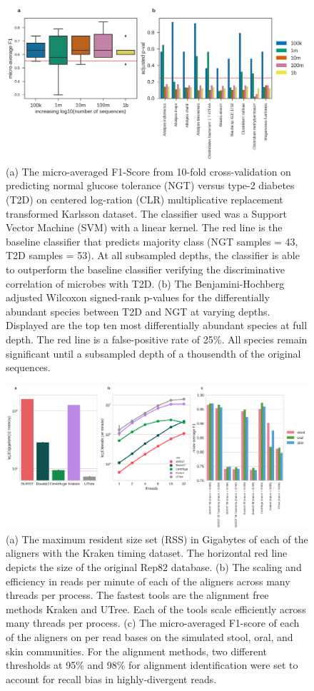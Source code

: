 \begin{figure}[hbt]
    \centering
    \includegraphics[width=0.8\linewidth]{fig/karlsson2013_f1_combined.png}
    \caption{
        (a) The micro-averaged F1-Score from 10-fold cross-validation on predicting normal glucose tolerance (NGT) versus type-2 diabetes (T2D) on centered log-ration (CLR) multiplicative replacement transformed Karlsson dataset. The classifier used was a Support Vector Machine (SVM) with a linear kernel. The red line is the baseline classifier that predicts majority class (NGT samples = 43, T2D samples = 53). At all subsampled depths, the classifier is able to outperform the baseline classifier verifying the discriminative correlation of microbes with T2D. (b) The Benjamini-Hochberg adjusted Wilcoxon signed-rank p-values for the differentially abundant species between T2D and NGT at varying depths. Displayed are the top ten most differentially abundant species at full depth. The red line is a false-positive rate of 25\%. All species remain significant until a subsampled depth of a thousendth of the original sequences.
    }
    \label{fig:karlsson2013_f1_combined}
\end{figure}

\begin{figure}[hbt]
    \centering
    \includegraphics[width=0.8\linewidth]{fig/simulations.png}
    \caption{
        (a) The maximum resident size set (RSS) in Gigabytes of each of the aligners with the Kraken timing dataset. The horizontal red line depicts the size of the original Rep82 database. (b) The scaling and efficiency in reads per minute of each of the aligners across many threads per process. The fastest tools are the alignment free methods Kraken and UTree. Each of the tools scale efficiently across many threads per process. (c) The micro-averaged F1-score of each of the aligners on per read bases on the simulated stool, oral, and skin communities. For the alignment methods, two different thresholds at 95\% and 98\% for alignment identification were set to account for recall bias in highly-divergent reads.
    }
    \label{fig:simulations}
\end{figure}

